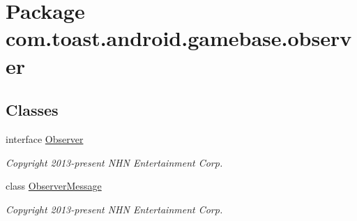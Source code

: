 \hypertarget{namespacecom_1_1toast_1_1android_1_1gamebase_1_1observer}{}\section{Package com.\+toast.\+android.\+gamebase.\+observer}
\label{namespacecom_1_1toast_1_1android_1_1gamebase_1_1observer}
\subsection*{Classes}
\begin{DoxyCompactItemize}
\item 
interface \hyperlink{interfacecom_1_1toast_1_1android_1_1gamebase_1_1observer_1_1_observer}{Observer}
\begin{DoxyCompactList}\small\item\em Copyright 2013-\/present N\+HN Entertainment Corp. \end{DoxyCompactList}\item 
class \hyperlink{classcom_1_1toast_1_1android_1_1gamebase_1_1observer_1_1_observer_message}{Observer\+Message}
\begin{DoxyCompactList}\small\item\em Copyright 2013-\/present N\+HN Entertainment Corp. \end{DoxyCompactList}\end{DoxyCompactItemize}
